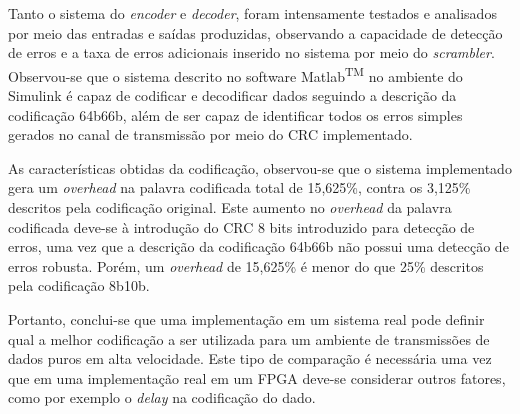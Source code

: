 Tanto o sistema do \textit{encoder} e \textit{decoder}, foram intensamente testados e analisados por meio das entradas e saídas produzidas, observando a capacidade de detecção de erros e a taxa de erros adicionais inserido no sistema por meio do \textit{scrambler}. Observou-se que o sistema descrito no software Matlab\textsuperscript{TM} no ambiente do Simulink é capaz de codificar e decodificar dados seguindo a descrição da codificação 64b66b, além de ser capaz de identificar todos os erros simples gerados no canal de transmissão por meio do CRC implementado. 

As características obtidas da codificação, observou-se que o sistema implementado gera um \textit{overhead} na palavra codificada total de 15,625\%, contra os 3,125\% descritos pela codificação original. Este aumento no \textit{overhead} da palavra codificada deve-se à introdução do CRC 8 bits introduzido para detecção de erros, uma vez que a descrição da codificação 64b66b não possui uma detecção de erros robusta. Porém, um \textit{overhead} de 15,625\% é menor do que 25\% descritos pela codificação 8b10b. 

Portanto, conclui-se que uma implementação em um sistema real pode definir qual a melhor codificação a ser utilizada para um ambiente de transmissões de dados puros em alta velocidade. Este tipo de comparação é necessária uma vez que em uma implementação real em um FPGA deve-se considerar outros fatores, como por exemplo o \textit{delay} na codificação do dado.
